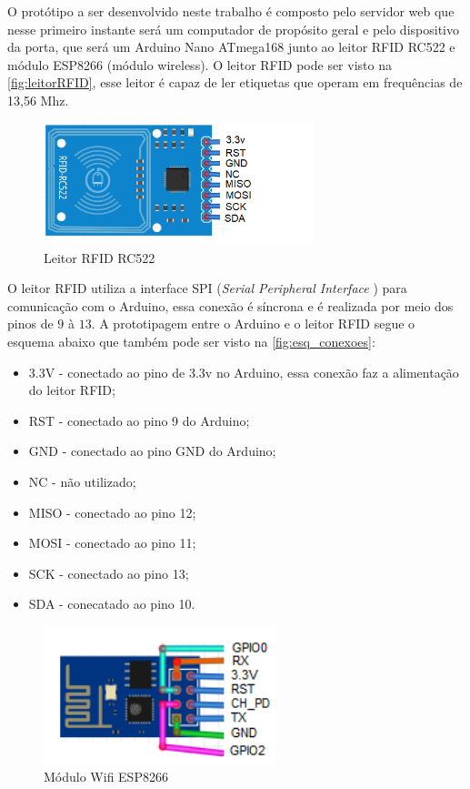 O protótipo a ser desenvolvido neste trabalho é composto pelo servidor web que nesse primeiro instante será um computador de 
propósito geral e pelo dispositivo da porta, que será um Arduino Nano ATmega168 junto ao leitor RFID RC522 e módulo ESP8266 (módulo wireless). 
O leitor RFID pode ser visto na \autoref{fig:leitorRFID}, esse leitor é capaz de ler etiquetas que operam em 
frequências de 13,56 Mhz.
\begin{figure}[H]
              \caption{\label{fig:leitorRFID}{Leitor RFID RC522}}
              \centering
              \includegraphics[width=0.7\textwidth]{Figuras/rfid_rc522.PNG}
\end{figure}

\par
O leitor RFID utiliza a interface SPI (\textit{Serial Peripheral Interface} ) para comunicação com o Arduino, 
essa conexão é síncrona e é realizada por meio dos pinos de $9$ à $13$. A prototipagem entre o Arduino e o leitor RFID 
segue o esquema abaixo que também pode ser visto na \autoref{fig:esq_conexoes}:
\begin{itemize}
    \item 3.3V - conectado ao pino de 3.3v no Arduino, essa conexão faz a alimentação do leitor RFID;
    \item RST - conectado ao pino 9 do Arduino;
    \item GND - conectado ao pino GND do Arduino;
    \item NC - não utilizado;
    \item MISO - conectado ao pino 12;
    \item MOSI - conectado ao pino 11; 
    \item SCK - conectado ao pino 13;
    \item SDA - conecatado ao pino 10.
\end{itemize}


\begin{figure}[H]
              \caption{\label{fig:moduloWii}{Módulo Wifi ESP8266}}
              \centering
              \includegraphics[width=0.6\textwidth]{Figuras/Modulo_ESP8266.png}
\end{figure}

